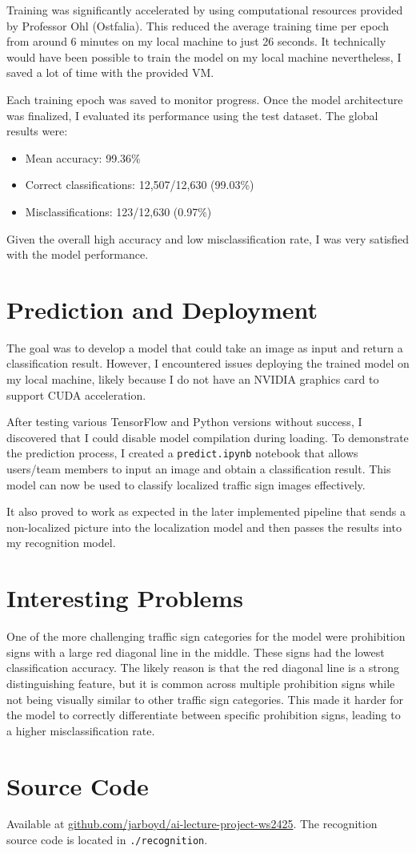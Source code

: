 \documentclass[runningheads]{llncs}
\begin{document}
Training was significantly accelerated by using computational resources provided by Professor Ohl (Ostfalia). This reduced the average training time per epoch from around 6 minutes on my local machine to just 26 seconds. It technically would have been possible to train the model on my local machine nevertheless, I saved a lot of time with the provided VM.

\pagebreak

Each training epoch was saved to monitor progress. Once the model architecture was finalized, I evaluated its performance using the test dataset. The global results were:

\begin{itemize}
    \item Mean accuracy: 99.36\%
    \item Correct classifications: 12,507/12,630 (99.03\%)
    \item Misclassifications: 123/12,630 (0.97\%)
\end{itemize}

Given the overall high accuracy and low misclassification rate, I was very satisfied with the model performance.

\section{Prediction and Deployment}
The goal was to develop a model that could take an image as input and return a classification result. However, I encountered issues deploying the trained model on my local machine, likely because I do not have an NVIDIA graphics card to support CUDA acceleration.

After testing various TensorFlow and Python versions without success, I discovered that I could disable model compilation during loading. To demonstrate the prediction process, I created a \texttt{predict.ipynb} notebook that allows users/team members to input an image and obtain a classification result. This model can now be used to classify localized traffic sign images effectively.

It also proved to work as expected in the later implemented pipeline that sends a non-localized picture into the localization model and then passes the results into my recognition model.

\section{Interesting Problems}
One of the more challenging traffic sign categories for the model were prohibition signs with a large red diagonal line in the middle. These signs had the lowest classification accuracy. The likely reason is that the red diagonal line is a strong distinguishing feature, but it is common across multiple prohibition signs while not being visually similar to other traffic sign categories. This made it harder for the model to correctly differentiate between specific prohibition signs, leading to a higher misclassification rate.

\section{Source Code}
Available at \href{https://github.com/jarboyd/ai-lecture-project-ws2425}{github.com/jarboyd/ai-lecture-project-ws2425}. The recognition source code is located in \texttt{./recognition}.
\end{document}
